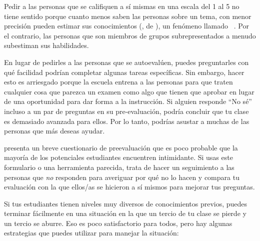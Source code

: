 Pedir a las personas que se califiquen a sí mismas en una escala del 1 al 5 no tiene sentido
porque cuanto menos saben las personas sobre un tema, 
con menor precisión pueden estimar sus conocimientos
(,
de ),
un fenómeno llamado  ~\cite{Krug1999}.
Por el contrario,
las personas que son miembros de grupos subrepresentados a menudo subestiman sus habilidades.


En lugar de pedirles a las personas que se autoevalúen,
puedes preguntarles con qué facilidad podrían completar algunas tareas específicas.
Sin embargo,
hacer esto es arriesgado
porque la escuela entrena a las personas
para que traten cualquier cosa que parezca un examen como algo que tienen que aprobar
en lugar de una oportunidad para dar forma a la instrucción.
Si alguien responde ``No sé'' incluso a un par de preguntas en su pre-evaluación,
podría concluir que tu clase es demasiado avanzada para ellos.
Por lo tanto, podrías asustar a muchas de las personas que más deseas ayudar.

 presenta un breve cuestionario de preevaluación
que es poco probable que la mayoría de los potenciales estudiantes encuentren intimidante.
Si usas este formulario o una herramienta parecida,
trata de hacer un seguimiento a las personas que \emph{no} responden para averiguar por qué no lo hacen
y compara tu evaluación con la que ellos/as se hicieron a sí mismos
para mejorar tus preguntas.


Si tus estudiantes tienen niveles muy diversos de conocimientos previos,
puedes terminar fácilmente en una situación en la que un tercio de tu clase se pierde
y un tercio se aburre.
Eso es poco satisfactorio para todos,
pero hay algunas estrategias que puedes utilizar para manejar la situación:

